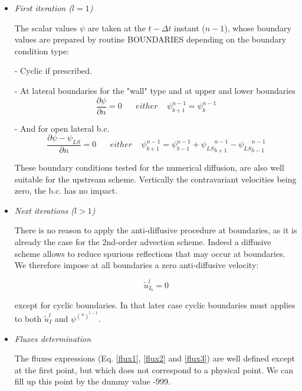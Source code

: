 \begin{itemize}
\item{\em {First iteration ($l=1$)}}

 The scalar values $\psi$ are taken at the $t-\Delta t$ instant ($n-1$),
whose boundary values are prepared by routine BOUNDARIES depending on the
boundary condition type:

- Cyclic if prescribed.

- At lateral boundaries for the "wall" type and at upper and lower boundaries
\begin{equation}
  \dfrac{\partial \psi }{\partial n } = 0 \;\;\;\;\;\; either \;\;\;\;
\psi^{n-1}_{b+1} = \psi^{n-1}_{b}
\end{equation}

- And for open lateral b.c.
\begin{equation}
  \dfrac{\partial \psi - \psi_{LS} }{\partial n } = 0 \;\;\;\;\;\; either \;\;\;\;
\psi^{n-1}_{b+1} = \psi^{n-1}_{b-1}
 + {\psi_{LS}}^{n-1}_{b+1} -{\psi_{LS}}^{n-1}_{b-1}
\end{equation}

\noindent These boundary conditions tested for the numerical diffusion, are also
well suitable for the upstream scheme. Vertically the contravariant velocities
being zero, the b.c. has no impact.

\item{\em {Next iterations ($l>1$)}}

 There is no reason to apply the anti-diffusive procedure at boundaries, as it
is already the case for the 2nd-order advection scheme. Indeed a diffusive
scheme allows to reduce spurious reflections that may occur at boundaries.
We therefore impose at all boundaries a zero anti-diffusive velocity:

\begin{equation}
\tilde{u}^{l}_{{I }_b} = 0
\end{equation}

\noindent except for cyclic boundaries. In that later case cyclic boundaries
must applies to both $\tilde{u}_I^{l}$ and $\psi^{(*)^{l-1}}$.

\item{\em {Fluxes determination}}

 The fluxes expressions (Eq. \ref{flux1}, \ref{flux2} and \ref{flux3}) are well defined except at the first
point, but which does not correspond to a physical point. We can fill up this
point by the dummy value -999.

\end{itemize}

